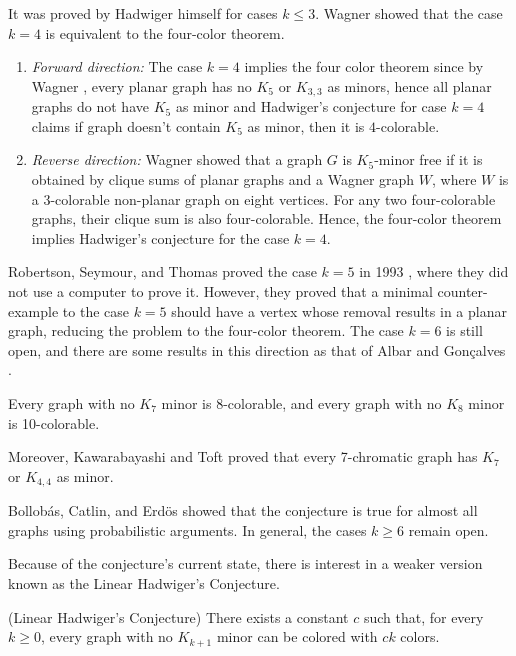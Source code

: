 It was proved by Hadwiger himself for cases $k \leq 3$. Wagner \cite{wagner_1937} showed that the case $k = 4$ is equivalent to the four-color theorem.
\begin{enumerate}
    \item \textit{Forward direction:} The case $k = 4$ implies the four color theorem since by Wagner \cite{wagner_1937}, every planar graph has no $K_5$ or $K_{3, 3}$ as 
 minors, hence all planar graphs do not have $K_5$ as minor and Hadwiger's conjecture for case $k = 4$ claims if graph doesn't contain
    $K_5$ as minor, then it is $4$-colorable.
    \item \textit{Reverse direction:} Wagner \cite{wagner_1937} showed that a graph $G$ is $K_5$-minor free if it is obtained by 
clique sums of planar graphs and a Wagner graph $W$, where $W$ is a 3-colorable non-planar graph on eight vertices.
For any two four-colorable graphs, their clique sum is also four-colorable. Hence, the four-color theorem implies Hadwiger's conjecture
for the case $k = 4$.
\end{enumerate}

Robertson, Seymour, and Thomas proved the case $k = 5$ in 1993 \cite{robertson_seymour_1993}, 
where they did not use a computer to prove it. However, they proved that a minimal counter-example to the case $k = 5$ should have 
a vertex whose removal results in a planar graph, reducing the problem to the four-color theorem. The case $k = 6$ is still open, and there are some results in this direction as that of Albar and Gonçalves \cite{albar_goncalves_2013}. 
\begin{thm}
 Every graph with no $K_7$ minor is 8-colorable, and every graph with no $K_8$ minor is 10-colorable.
\end{thm}

Moreover, Kawarabayashi and Toft \cite{Kawarabayashi2005} proved that every 7-chromatic graph has $K_7$ or $K_{4,4}$ as minor.

Bollobás, Catlin, and Erdös \cite{BOLLOBAS1980195} showed that the conjecture is true for almost all graphs using
probabilistic arguments. In general, the cases $k \geq 6$ remain open.

Because of the conjecture's current state, there is interest in a weaker version known as the Linear Hadwiger's Conjecture.

\begin{conj} (Linear Hadwiger's Conjecture)
 There exists a constant $c$ such that, for every $k \geq 0$, every graph with no $K_{k+1}$ minor can be colored with $ck$ colors.
\end{conj}

